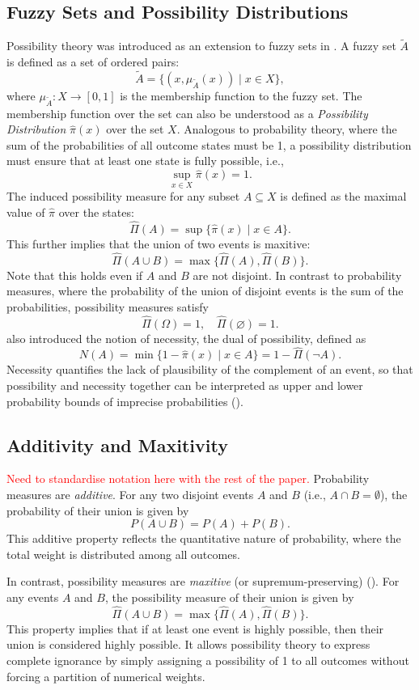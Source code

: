 \documentclass[12pt,a4paper]{report}
\newcommand\myworries[1]{\textcolor{red}{#1}}
\begin{document}
\subsection{Fuzzy Sets and Possibility Distributions}
Possibility theory was introduced as an extension to fuzzy sets in \cite{ZADEH19999}. A fuzzy set $\tilde{A}$ is defined as a set of ordered pairs:
\[
  \tilde{A} = \{(x, \mu_{\tilde{A}}(x)) \mid x \in X\},
\]
where $\mu_{\tilde{A}}: X \to [0,1]$ is the membership function to the fuzzy set. The membership function over the set can also be understood as a \emph{Possibility Distribution} $\hat{\pi}(x)$ over the set $X$. Analogous to probability theory, where the sum of the probabilities of all outcome states must be 1, a possibility distribution must ensure that at least one state is fully possible, i.e.,
\[
  \sup_{x \in X} \hat{\pi}(x) = 1.
\]
The induced possibility measure for any subset $A \subseteq X$ is defined as the maximal value of $\hat{\pi}$ over the states:
\[
  \hat{\Pi}(A) = \sup \{ \hat{\pi}(x) \mid x \in A \}.
\]
This further implies that the union of two events is maxitive:
\[
  \hat{\Pi}(A \cup B) = \max\{\hat{\Pi}(A),\hat{\Pi}(B)\}.
\]
Note that this holds even if $A$ and $B$ are not disjoint. In contrast to probability measures, where the probability of the union of disjoint events is the sum of the probabilities, possibility measures satisfy
\[
\hat{\Pi}(\Omega) = 1,\quad \hat{\Pi}(\varnothing) = 1.
\]
\cite{Dubois2001} also introduced the notion of necessity, the dual of possibility, defined as
\[
  N(A) = \min\{1-\hat{\pi}(x) \mid x \in A\} = 1 - \hat{\Pi}(\neg A).
\]
Necessity quantifies the lack of plausibility of the complement of an event, so that possibility and necessity together can be interpreted as upper and lower probability bounds of imprecise probabilities (\cite{DUBOIS199265}).

\subsection{Additivity and Maxitivity}
\myworries{Need to standardise notation here with the rest of the paper.}
Probability measures are \emph{additive}. For any two disjoint events \(A\) and \(B\) (i.e., \(A\cap B=\emptyset\)), the probability of their union is given by
\[
P(A \cup B) = P(A) + P(B).
\]
This additive property reflects the quantitative nature of probability, where the total weight is distributed among all outcomes.

In contrast, possibility measures are \emph{maxitive} (or supremum-preserving) (\cite{Dubois:2007}). For any events \(A\) and \(B\), the possibility measure of their union is given by
\[
  \hat{\Pi}(A \cup B) = \max\{\hat{\Pi}(A), \hat{\Pi}(B)\}.
\]
This property implies that if at least one event is highly possible, then their union is considered highly possible. It allows possibility theory to express complete ignorance by simply assigning a possibility of 1 to all outcomes without forcing a partition of numerical weights.
\end{document}

